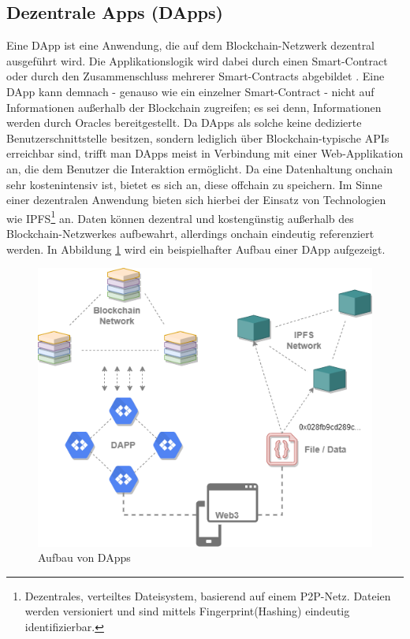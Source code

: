 \subsection{Dezentrale Apps (DApps)}
\label{subsec:fundamentals:dlt:dapps}
Eine \ac{DApp} ist eine Anwendung, die auf dem Blockchain-Netzwerk dezentral ausgeführt wird. Die Applikationslogik wird dabei durch einen Smart-Contract oder durch den Zusammenschluss mehrerer Smart-Contracts abgebildet \cite{dapps2018}. Eine \ac{DApp} kann demnach - genauso wie ein einzelner Smart-Contract - nicht auf Informationen außerhalb der Blockchain zugreifen; es sei denn, Informationen werden durch Oracles bereitgestellt. Da \ac{DApp}s als solche keine dedizierte Benutzerschnittstelle besitzen, sondern lediglich über Blockchain-typische \ac{API}s erreichbar sind, trifft man \ac{DApp}s meist in Verbindung mit einer Web-Applikation an, die dem Benutzer die Interaktion ermöglicht. Da eine Datenhaltung onchain sehr kostenintensiv ist, bietet es sich an, diese offchain zu speichern. Im Sinne einer dezentralen Anwendung bieten sich hierbei der Einsatz von Technologien wie \ac{IPFS}\footnote{Dezentrales, verteiltes Dateisystem, basierend auf einem \ac{P2P}-Netz. Dateien werden versioniert und sind mittels Fingerprint(Hashing) eindeutig identifizierbar.} an. Daten können dezentral und kostengünstig außerhalb des Blockchain-Netzwerkes aufbewahrt, allerdings onchain eindeutig referenziert werden. In Abbildung \ref{fig:chapter02:overview-dapp} wird ein beispielhafter Aufbau einer \ac{DApp} aufgezeigt.

\begin{figure}[h]
 \centering
 \includegraphics[width=1.0\textwidth]{gfx/Overview-DAPP.png}
 \caption{Aufbau von DApps}
 \label{fig:chapter02:overview-dapp}
\end{figure}

